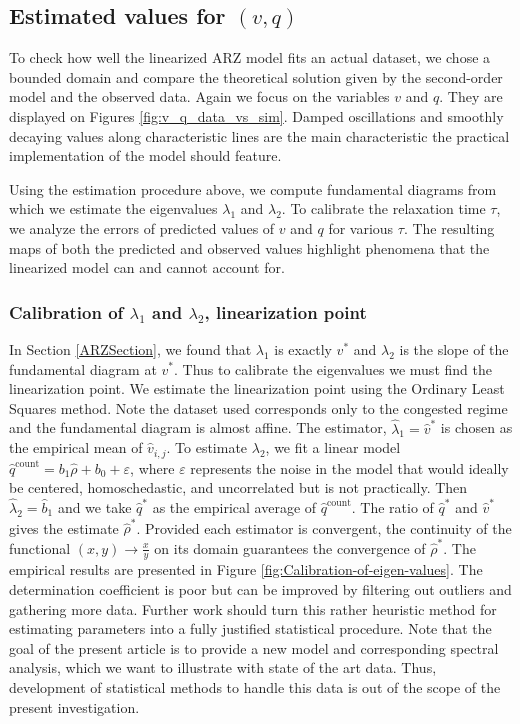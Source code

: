 \documentclass[a4paper, 10pt, conference]{ieeeconf}      %
\DeclareMathOperator{\cnt}{count}
\begin{document}
\subsection{Estimated values for $\left(v,q\right)$} 

To check how well the linearized ARZ model fits an actual dataset, we chose a bounded domain and compare the theoretical solution given by the second-order model and the observed data. Again we focus on the variables $v$ and $q$. They are displayed on Figures \ref{fig:v_q_data_vs_sim}. Damped oscillations and smoothly decaying values along characteristic lines are the main characteristic the practical implementation of the model should feature.

Using the estimation procedure above, we compute fundamental diagrams from which we estimate the eigenvalues $\lambda_{1}$ and $\lambda_{2}$.
To calibrate the relaxation time $\tau$, we analyze the errors of predicted values of $v$ and $q$ for various $\tau$. The resulting maps of both the predicted and observed values highlight phenomena that the linearized model can and cannot account for.

\subsubsection{Calibration of $\lambda_{1}$ and $\lambda_{2}$, linearization point}
In Section \ref{ARZSection}, we found that $\lambda_{1}$ is exactly $v^*$ and $\lambda_{2}$ is the slope of the fundamental diagram at $v^*$. Thus to calibrate the eigenvalues we must find the linearization point. We estimate the linearization point using the Ordinary Least Squares method. Note the dataset used corresponds only to the congested regime and the fundamental diagram is almost affine. The estimator, $\widehat{\lambda}_1=\widehat{v}^*$ is chosen as the empirical mean of $\widehat{v}_{i,j}$. To estimate $\lambda_{2}$, we fit a linear model $\widehat{q}^{\text{count}}=b_{1}\widehat{\rho}+b_{0}+\varepsilon$, where $\varepsilon$
represents the noise in the model that would ideally be centered,
homoschedastic, and uncorrelated but is not practically. Then $\widehat{\lambda}_{2}=\widehat{b}_{1}$ and we take $\widehat{q}^*$ as the empirical average of $\widehat{q}^{\cnt}$. The ratio of $\widehat{q}^*$ and $\widehat{v}^*$ gives the estimate $\widehat{\rho}^*$.
Provided each estimator is convergent, the continuity of the functional
$\left(x,y\right)\rightarrow\frac{x}{y}$ on its domain guarantees the convergence of $\widehat{\rho}^*$. The empirical results are presented in Figure \ref{fig:Calibration-of-eigen-values}. The determination coefficient is poor but can be improved by filtering out outliers and gathering more data. Further work should turn this rather heuristic method for estimating parameters into a fully justified statistical procedure. Note that the goal of the present article is to provide a new model and corresponding spectral analysis, which we want to illustrate with state of the art data. Thus, development of statistical methods to handle this data is out of the scope of the present investigation.
\end{document}
